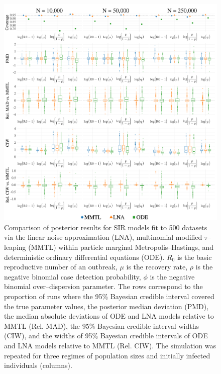 \begin{figure}[htbp]
	\begin{fullpage}
		\centering
		\includegraphics[width=\textwidth]{figures/lna_coverage_plots_main}
		\caption[Coverage simulation results for SIR models fit via the LNA, ODE, and MMTL approximations.]{Comparison of posterior results for SIR models fit to 500 datasets via the linear noise approximation (LNA), multinomial modified $ \tau $--leaping (MMTL) within particle marginal Metropolis--Hastings, and deterministic ordinary differential equations (ODE). $ R_0 $ is the basic reproductive number of an outbreak, $ \mu $ is the recovery rate, $ \rho $ is the negative binomial case detection probability, $ \phi $ is the negative binomial over--dispersion parameter. The rows correspond to the proportion of runs where the 95\% Bayesian credible interval covered the true parameter values, the posterior median deviation (PMD), the median absolute deviations of ODE and LNA models relative to MMTL (Rel. MAD), the 95\% Bayesian credible interval widths (CIW), and the widths of 95\% Bayesian credible intervals of ODE and LNA models relative to MMTL (Rel. CIW). The simulation was repeated for three regimes of population sizes and initially infected individuals (columns).}
		\label{fig:lna_coverage_main}
	\end{fullpage}
\end{figure}

